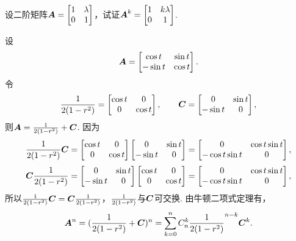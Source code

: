 \begin{example}
设二阶矩阵\(\boldsymbol{A}=\begin{bmatrix} 1 & \lambda \\ 0 & 1 \end{bmatrix}\)，试证\(\boldsymbol{A}^k=\begin{bmatrix} 1 & k\lambda \\ 0 & 1 \end{bmatrix}\).
\end{example}

\begin{example}
设\[
\boldsymbol{A} = \begin{bmatrix}
\cos t & \sin t \\
-\sin t & \cos t
\end{bmatrix}.
\]令\[
\frac{1}{2(1-r^2)} = \begin{bmatrix}
\cos t & 0 \\
0 & \cos t
\end{bmatrix}, \qquad
\boldsymbol{C} = \begin{bmatrix}
0 & \sin t \\
-\sin t & 0
\end{bmatrix},
\]则\(\boldsymbol{A}=\frac{1}{2(1-r^2)}+\boldsymbol{C}\).
因为\[
\frac{1}{2(1-r^2)}\boldsymbol{C} = \begin{bmatrix}
\cos t & 0 \\
0 & \cos t
\end{bmatrix} \begin{bmatrix}
0 & \sin t \\
-\sin t & 0
\end{bmatrix} = \begin{bmatrix}
0 & \cos t \sin t \\
-\cos t \sin t & 0
\end{bmatrix},
\]\[
\boldsymbol{C}\frac{1}{2(1-r^2)} = \begin{bmatrix}
0 & \sin t \\
-\sin t & 0
\end{bmatrix} \begin{bmatrix}
\cos t & 0 \\
0 & \cos t
\end{bmatrix} = \begin{bmatrix}
0 & \cos t \sin t \\
-\cos t \sin t & 0
\end{bmatrix},
\]所以\(\frac{1}{2(1-r^2)}\boldsymbol{C}=\boldsymbol{C}\frac{1}{2(1-r^2)}\)，\(\frac{1}{2(1-r^2)}\)与\(\boldsymbol{C}\)可交换.
由牛顿二项式定理有，\[
\boldsymbol{A}^n=(\frac{1}{2(1-r^2)}+\boldsymbol{C})^n
=\sum\limits_{k=0}^n C_n^k \frac{1}{2(1-r^2)}^{n-k} \boldsymbol{C}^k.
\]
\end{example}

